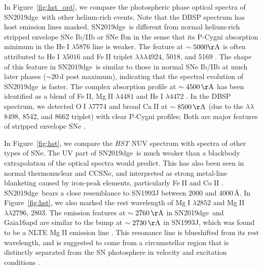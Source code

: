 \documentclass[twocolumn]{aastex63}
\newcommand{\name}{SN2019dge}
\def\ion#1#2{#1$\;${\footnotesize\rm{#2}}\relax}
\begin{document}
\begin{CJK*}{UTF8}{gbsn}
In Figure~\ref{fig:hst_opt}, we compare the photospheric phase optical spectra of 
\name\ with other helium-rich events. Note that the DBSP spectrum has host emission lines 
masked. \name\ is different from normal helium-rich stripped envelope SNe Ib/IIb or SNe Ibn in the 
sense that its P-Cygni absorption minimum in the \ion{He}{I} $\lambda5876$ line is weaker. The 
feature at $\sim5000{\rm \AA}$ is often attributed to \ion{He}{I} $\lambda 5016$ and \ion{Fe}{II} triplet 
$\lambda\lambda\lambda4924$, 5018, and 5169 \citep{Liu2016}. The shape of this feature in 
\name\ is similar to those in normal SNe Ib/IIb at much later phases ($\sim 20$\,d post maximum), 
indicating that the spectral evolution of \name\ is faster. The complex absorption profile at 
$\sim4500\,{\rm \AA}$ has been identified as a blend of \ion{Fe}{II}, \ion{Mg}{II} $\lambda 4481$ 
and \ion{He}{I} $\lambda 4472$ \citep{Hamuy2002}. In the DBSP spectrum, we detected \ion{O}{I} 
$\lambda 7774$ and broad \ion{Ca}{II} at $\sim8500\,{\rm \AA}$ (due to the
$\lambda\lambda$ 8498, 8542, and 8662 triplet) with clear P-Cygni profiles; Both are major features 
of stripped envelope SNe 
\citep{GalYam2017}. 

In Figure~\ref{fig:hst}, we compare the \textit{HST} NUV spectrum with spectra of other types of SNe. 
The UV part of \name\ is much weaker than a blackbody extrapolation of the optical spectra would 
predict. This has also been seen in normal thermonuclear and CCSNe, and interpreted as strong 
metal-line blanketing caused by iron-peak elements, particularly \ion{Fe}{II} and \ion{Co}{II} 
\citep{Gal-Yam2008}. \name\ bears a close resemblance to SN1993J between 2000 and 4000\,\AA. 
In Figure~\ref{fig:hst}, we also marked the rest wavelength of \ion{Mg}{I} $\lambda2852$ and 
\ion{Mg}{II} 
$\lambda \lambda 2796$, 2803. The emission features at $\sim2760\,{\rm \AA}$ in \name\ and 
Gaia16apd are similar to the bump at $\sim2730\,{\rm \AA}$ in SN1993J, which was found to be a NLTE 
\ion{Mg}{II} emission line \citep{Jeffery1994}. This resonance line is blueshifted from its rest wavelength,
and is suggested to come from a circumstellar region that is distinctly separated from the SN 
photosphere in velocity and excitation conditions \citep{Panagia1980, Fransson1984}.


\end{CJK*}
\end{document}
